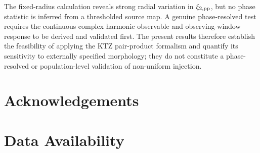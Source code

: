 \documentclass[fleqn,usenatbib]{mnras}
\begin{document}
The fixed-radius calculation reveals strong radial variation in $\xi_{2,{\rm pp}}$, but no phase statistic is inferred from a thresholded source map.  A genuine phase-resolved test requires the continuous complex harmonic observable and observing-window response to be derived and validated first.  The present results therefore establish the feasibility of applying the KTZ pair-product formalism and quantify its sensitivity to externally specified morphology; they do not constitute a phase-resolved or population-level validation of non-uniform injection.

\section*{Acknowledgements}

\section*{Data Availability}





\bsp
\label{lastpage}
\end{document}
